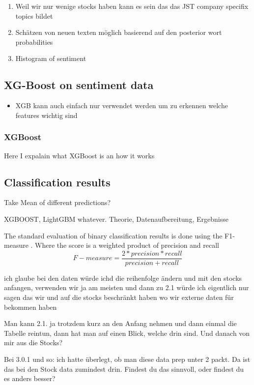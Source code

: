 \begin{enumerate}
    \item Weil wir nur wenige stocks haben kann es sein das das JST company specifix topics bildet
    \item Schätzen von neuen texten möglich basierend auf den posterior wort probabilities
    \item Histogram of sentiment
\end{enumerate}




\subsection{XG-Boost on sentiment data}
\begin{itemize}
    \item XGB kann auch einfach nur verwendet werden um zu erkennen welche features wichtig sind
\end{itemize}
\subsubsection{XGBoost}
Here I expalain what XGBoost is an how it works

\subsection{Classification results}
Take Mean of different predictions?

XGBOOST, LightGBM whatever. 
Theorie, Datenaufbereitung, Ergebnisse

The standard evaluation of binary classification results is done using the F1-measure \citep{HADDI201326}. Where the score is a weighted product of precision and recall
\begin{equation} 
    F-measure = \frac{2*precision * recall}{precision + recall}
\end{equation}



ich glaube bei den daten würde ichd die reihenfolge ändern und mit den stocks anfangen, verwenden wir ja am meisten und dann zu 2.1  würde ich eigentlich nur sagen das wir und auf die stocks beschränkt haben wo wir externe daten für bekommen haben

Man kann 2.1. ja trotzdem kurz an den Anfang nehmen und dann einmal die Tabelle reintun, dann hat man auf einen Blick, welche drin sind. Und danach von mir aus die Stocks?

Bei 3.0.1 und so: ich hatte überlegt, ob man diese data prep unter 2 packt. Da ist das bei den Stock data zumindest drin. Findest du das sinnvoll, oder findest du es anders besser?


